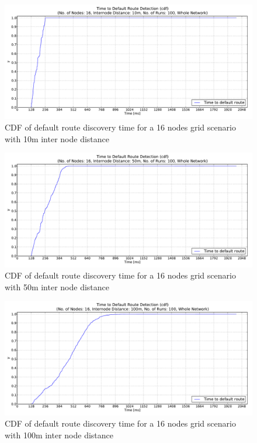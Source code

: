 \begin{figure}[htbp]
  \begin{center}
    \leavevmode
      \includegraphics[width=\textwidth]
      {Pics/results/16/MRHOF/grid/dist10_montecarlo_cdf_hist.pdf}
   \caption{CDF of default route discovery time for a 16 nodes grid scenario with 10m inter node distance}
   \label{fig:16_MRHOF_grid_10_cdf}
  \end{center}
\end{figure}

\begin{figure}[htbp]
  \begin{center}
    \leavevmode
      \includegraphics[width=\textwidth]
      {Pics/results/16/MRHOF/grid/dist50_montecarlo_cdf_hist.pdf}
   \caption{CDF of default route discovery time for a 16 nodes grid scenario with 50m inter node distance}
   \label{fig:16_MRHOF_grid_50_cdf}
  \end{center}
\end{figure}

\begin{figure}[htbp]
  \begin{center}
    \leavevmode
      \includegraphics[width=\textwidth]
      {Pics/results/16/MRHOF/grid/dist100_montecarlo_cdf_hist.pdf}
   \caption{CDF of default route discovery time for a 16 nodes grid scenario with 100m inter node distance}
   \end{center}
\end{figure}


